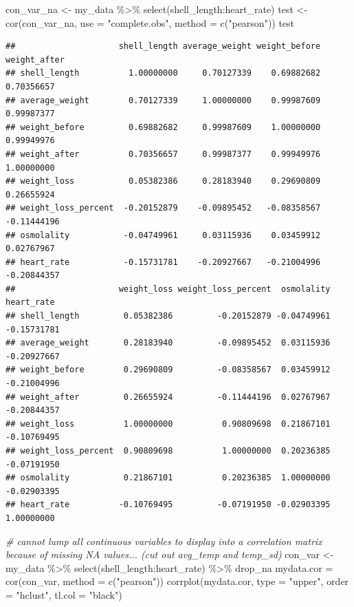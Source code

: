\documentclass[
]{article}
\newenvironment{Shaded}{\begin{snugshade}}{\end{snugshade}}
\newcommand{\AttributeTok}[1]{\textcolor[rgb]{0.77,0.63,0.00}{#1}}
\newcommand{\CommentTok}[1]{\textcolor[rgb]{0.56,0.35,0.01}{\textit{#1}}}
\newcommand{\FunctionTok}[1]{\textcolor[rgb]{0.00,0.00,0.00}{#1}}
\newcommand{\NormalTok}[1]{#1}
\newcommand{\OtherTok}[1]{\textcolor[rgb]{0.56,0.35,0.01}{#1}}
\newcommand{\SpecialCharTok}[1]{\textcolor[rgb]{0.00,0.00,0.00}{#1}}
\newcommand{\StringTok}[1]{\textcolor[rgb]{0.31,0.60,0.02}{#1}}
\begin{document}
\begin{Shaded}
\begin{Highlighting}[]
\NormalTok{con\_var\_na }\OtherTok{\textless{}{-}}\NormalTok{ my\_data }\SpecialCharTok{\%\textgreater{}\%} \FunctionTok{select}\NormalTok{(shell\_length}\SpecialCharTok{:}\NormalTok{heart\_rate)}
\NormalTok{test }\OtherTok{\textless{}{-}} \FunctionTok{cor}\NormalTok{(con\_var\_na, }\AttributeTok{use =} \StringTok{"complete.obs"}\NormalTok{, }\AttributeTok{method =} \FunctionTok{c}\NormalTok{(}\StringTok{"pearson"}\NormalTok{))}
\NormalTok{test}
\end{Highlighting}
\end{Shaded}

\begin{verbatim}
##                     shell_length average_weight weight_before weight_after
## shell_length          1.00000000     0.70127339    0.69882682   0.70356657
## average_weight        0.70127339     1.00000000    0.99987609   0.99987377
## weight_before         0.69882682     0.99987609    1.00000000   0.99949976
## weight_after          0.70356657     0.99987377    0.99949976   1.00000000
## weight_loss           0.05382386     0.28183940    0.29690809   0.26655924
## weight_loss_percent  -0.20152879    -0.09895452   -0.08358567  -0.11444196
## osmolality           -0.04749961     0.03115936    0.03459912   0.02767967
## heart_rate           -0.15731781    -0.20927667   -0.21004996  -0.20844357
##                     weight_loss weight_loss_percent  osmolality  heart_rate
## shell_length         0.05382386         -0.20152879 -0.04749961 -0.15731781
## average_weight       0.28183940         -0.09895452  0.03115936 -0.20927667
## weight_before        0.29690809         -0.08358567  0.03459912 -0.21004996
## weight_after         0.26655924         -0.11444196  0.02767967 -0.20844357
## weight_loss          1.00000000          0.90809698  0.21867101 -0.10769495
## weight_loss_percent  0.90809698          1.00000000  0.20236385 -0.07191950
## osmolality           0.21867101          0.20236385  1.00000000 -0.02903395
## heart_rate          -0.10769495         -0.07191950 -0.02903395  1.00000000
\end{verbatim}

\begin{Shaded}
\begin{Highlighting}[]
\CommentTok{\# cannot lump all continuous variables to display into a correlation matrix because of missing NA values... (cut out avg\_temp and temp\_sd)}
\NormalTok{con\_var }\OtherTok{\textless{}{-}}\NormalTok{ my\_data }\SpecialCharTok{\%\textgreater{}\%} \FunctionTok{select}\NormalTok{(shell\_length}\SpecialCharTok{:}\NormalTok{heart\_rate) }\SpecialCharTok{\%\textgreater{}\%}\NormalTok{ drop\_na}
\NormalTok{mydata.cor }\OtherTok{=} \FunctionTok{cor}\NormalTok{(con\_var, }\AttributeTok{method =} \FunctionTok{c}\NormalTok{(}\StringTok{"pearson"}\NormalTok{))}
\FunctionTok{corrplot}\NormalTok{(mydata.cor, }\AttributeTok{type =} \StringTok{"upper"}\NormalTok{, }\AttributeTok{order =} \StringTok{"hclust"}\NormalTok{, }\AttributeTok{tl.col =} \StringTok{"black"}\NormalTok{)}
\end{Highlighting}
\end{Shaded}
\end{document}
